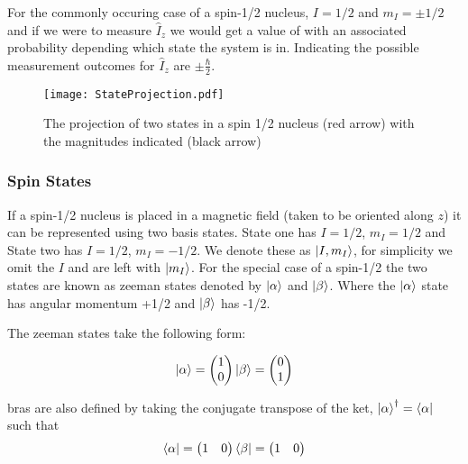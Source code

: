 For the commonly occuring case of a spin-1/2 nucleus, $I=1/2$ and $m_I = ±1/2$ and if we were to measure $\hat{I}_z$ we would get a value of  with an associated probability depending which state the system is in. Indicating the possible measurement outcomes for $\hat{I}_z$ are $±\frac{\hbar}{2}$.

\begin{figure}
  \begin{center}
  \texttt{[image: StateProjection.pdf]}
  \end{center}
  \caption{The projection of two states in a spin 1/2 nucleus (red arrow) with the magnitudes indicated (black arrow)}
  \label{fig:Projection}
\end{figure}

\subsubsection{Spin States}\label{SpinStates}

If a spin-1/2 nucleus is placed in a magnetic field (taken to be oriented along $z$) it can be represented using two basis states.
State one has $I = 1/2$, $m_I = 1/2$ and State two has $I = 1/2$, $m_I = -1/2$. We denote these as $\ket{I,m_I}$\citep{dirac_1939}, for simplicity we omit the $I$ and are left with
$\ket{m_I}$. For the special case of a spin-1/2 the two states are known as zeeman states denoted by $\ket{\alpha}$ and $\ket{\beta}$. Where the $\ket{\alpha}$ state has angular momentum +1/2 and $\ket{\beta}$ has -1/2.

The zeeman states take the following form:

\begin{equation}
  \ket{\alpha} = \begin{pmatrix}
    1\\
    0
\end{pmatrix}
 \ket{\beta} = \begin{pmatrix}
   0\\
   1
\end{pmatrix}
\end{equation}

bras are also defined by taking the conjugate transpose of the ket, $\ket{\alpha}^{\dagger} =
\bra{\alpha}$ such that
\begin{equation}
  \bra{\alpha} = \begin{pmatrix}
    1 & 0
\end{pmatrix}
  \bra{\beta} = \begin{pmatrix}
  1 & 0
\end{pmatrix}
\end{equation}

